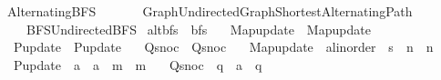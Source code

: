 %
\begin{isabellebody}%
%
%
\isadelimtheory
%
\endisadelimtheory
%
\isatagtheory
{}\isamarkupfalse%
\ Alternating{\isacharunderscore}{\kern0pt}BFS\isanewline
\ \ \isanewline
\ \ \ \ {\isachardoublequoteopen}{\isachardot}{\kern0pt}{\isachardot}{\kern0pt}{\isacharslash}{\kern0pt}Graph{\isacharslash}{\kern0pt}Undirected{\isacharunderscore}{\kern0pt}Graph{\isacharslash}{\kern0pt}Shortest{\isacharunderscore}{\kern0pt}Alternating{\isacharunderscore}{\kern0pt}Path{\isachardoublequoteclose}\isanewline
\ \ \ \ {\isachardoublequoteopen}{\isachardot}{\kern0pt}{\isachardot}{\kern0pt}{\isacharslash}{\kern0pt}BFS{\isacharslash}{\kern0pt}Undirected{\isacharunderscore}{\kern0pt}BFS{\isachardoublequoteclose}\isanewline
{}%
\endisatagtheory
{\isafoldtheory}%
%
\isadelimtheory
\isanewline
%
\endisadelimtheory
\isanewline
{}\isamarkupfalse%
\ alt{\isacharunderscore}{\kern0pt}bfs\ {\isacharequal}{\kern0pt}\ bfs\ \isanewline
\ \ Map{\isacharunderscore}{\kern0pt}update\ {\isacharequal}{\kern0pt}\ Map{\isacharunderscore}{\kern0pt}update\ \isanewline
\ \ P{\isacharunderscore}{\kern0pt}update\ {\isacharequal}{\kern0pt}\ P{\isacharunderscore}{\kern0pt}update\ \isanewline
\ \ Q{\isacharunderscore}{\kern0pt}snoc\ {\isacharequal}{\kern0pt}\ Q{\isacharunderscore}{\kern0pt}snoc\ \isanewline
\ \ Map{\isacharunderscore}{\kern0pt}update\ {\isacharcolon}{\kern0pt}{\isacharcolon}{\kern0pt}\ {\isachardoublequoteopen}{\isacharprime}{\kern0pt}a{\isacharcolon}{\kern0pt}{\isacharcolon}{\kern0pt}linorder\ {\isasymRightarrow}\ {\isacharprime}{\kern0pt}s\ {\isasymRightarrow}\ {\isacharprime}{\kern0pt}n\ {\isasymRightarrow}\ {\isacharprime}{\kern0pt}n{\isachardoublequoteclose}\ \isanewline
\ \ P{\isacharunderscore}{\kern0pt}update\ {\isacharcolon}{\kern0pt}{\isacharcolon}{\kern0pt}\ {\isachardoublequoteopen}{\isacharprime}{\kern0pt}a\ {\isasymRightarrow}\ {\isacharprime}{\kern0pt}a\ {\isasymRightarrow}\ {\isacharprime}{\kern0pt}m\ {\isasymRightarrow}\ {\isacharprime}{\kern0pt}m{\isachardoublequoteclose}\ \isanewline
\ \ Q{\isacharunderscore}{\kern0pt}snoc\ {\isacharcolon}{\kern0pt}{\isacharcolon}{\kern0pt}\ {\isachardoublequoteopen}{\isacharprime}{\kern0pt}q\ {\isasymRightarrow}\ {\isacharprime}{\kern0pt}a\ {\isasymRightarrow}\ {\isacharprime}{\kern0pt}q{\isachardoublequoteclose}\isanewline
{}%
\isadelimdocument
%
\endisadelimdocument

\end{isabellebody}
